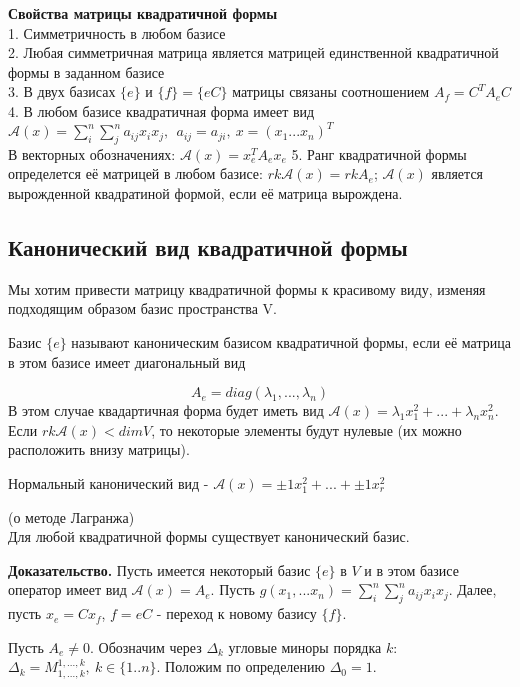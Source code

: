 \textbf{Свойства матрицы квадратичной формы}\\
1. Симметричность в любом базисе\\
2. Любая симметричная матрица является матрицей единственной квадратичной формы
в заданном базисе\\
3. В двух базисах $\{e\}$ и $\{f\}=\{eC\}$ матрицы связаны соотношением
$A_f=C^TA_eC$\\
4. В любом базисе квадратичная форма имеет вид $\mathcal A(x)=
\sum\limits_i^n\sum\limits_j^na_{ij}x_ix_j,~~a_{ij}=a_{ji},~x=(x_1...x_n)^T$\\
В векторных обозначениях: $\mathcal A(x)=x_e^TA_ex_e$
5. Ранг квадратичной формы определется её матрицей в любом базисе: 
$rk\mathcal A(x)=rkA_e$; $\mathcal A(x)$ является вырожденной квадратиной
формой, если её матрица вырождена.

\subsection{Канонический вид квадратичной формы}
Мы хотим привести матрицу квадратичной формы к красивому виду, изменяя
подходящим образом базис пространства V.
 \begin{defin}
 Базис $\{e\}$ называют каноническим базисом квадратичной формы, если её 
 матрица в этом базисе имеет диагональный вид
 \end{defin}
 $$A_e=diag(\lambda_1,...,\lambda_n)$$
 В этом случае квадартичная форма будет иметь вид
 $\mathcal A(x)=\lambda_1x_1^2+...+\lambda_nx_n^2$.
 Если $rk\mathcal A(x)<dimV$, то некоторые элементы будут нулевые
 (их можно расположить внизу матрицы).
 \begin{defin}
 Нормальный канонический вид - $\mathcal A(x)=\pm1 x_1^2+...+\pm1 x_r^2$
 \end{defin}
 


 \begin{theor} (о методе Лагранжа)\\
 Для любой квадратичной формы существует канонический базис.
 \end{theor}
 \textbf{Доказательство.} Пусть имеется некоторый базис $\{e\}$ в $V$ и в этом
 базисе оператор имеет вид $\mathcal A(x)=A_e$. Пусть $g(x_1,...x_n)=
 \sum\limits_i^n\sum\limits_j^na_{ij}x_ix_j$. Далее, пусть $x_e=Cx_f$, $f=eC$ -
 переход к новому базису $\{f\}$. 
 
 Пусть $A_e\ne0$. Обозначим через $\Delta_k$ угловые миноры порядка $k$:
 $\Delta_k=M^{1,...,k}_{1,...,k},~k\in\{1..n\}$. Положим по определению
 $\Delta_0=1$.
 
